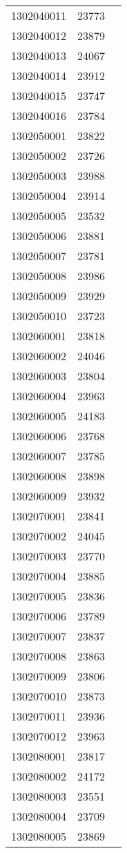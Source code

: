\begin{longtable}[h]{lcc}
		1302040011 & 23773\\
		1302040012 & 23879\\
		1302040013 & 24067\\
		1302040014 & 23912\\
		1302040015 & 23747\\
		1302040016 & 23784\\
		1302050001 & 23822\\
		1302050002 & 23726\\
		1302050003 & 23988\\
		1302050004 & 23914\\
		1302050005 & 23532\\
		1302050006 & 23881\\
		1302050007 & 23781\\
		1302050008 & 23986\\
		1302050009 & 23929\\
		1302050010 & 23723\\
		1302060001 & 23818\\
		1302060002 & 24046\\
		1302060003 & 23804\\
		1302060004 & 23963\\
		1302060005 & 24183\\
		1302060006 & 23768\\
		1302060007 & 23785\\
		1302060008 & 23898\\
		1302060009 & 23932\\
		1302070001 & 23841\\
		1302070002 & 24045\\
		1302070003 & 23770\\
		1302070004 & 23885\\
		1302070005 & 23836\\
		1302070006 & 23789\\
		1302070007 & 23837\\
		1302070008 & 23863\\
		1302070009 & 23806\\
		1302070010 & 23873\\
		1302070011 & 23936\\
		1302070012 & 23963\\
		1302080001 & 23817\\
		1302080002 & 24172\\
		1302080003 & 23551\\
		1302080004 & 23709\\
		1302080005 & 23869\\

\end{longtable}
